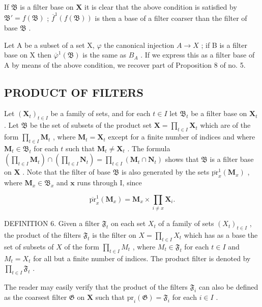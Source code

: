 If \(\mathfrak{B}\) is a filter base on \(\mathbf{X}\) it is clear that the above condition is satisfied by \(\mathfrak{B}' = f(\mathfrak{B})\) ; \(\overline{f}^1 (f(\mathfrak{B}))\) is then a base of a filter coarser than the filter of base \(\mathfrak{B}\) .

Let A be a subset of a set X, \(\varphi\) the canonical injection \(A \rightarrow X\) ; if B is a filter base on X then \(\overline{\varphi}^{1}(\mathfrak{B})\) is the same as \(B_{A}\) . If we express this as a filter base of A by means of the above condition, we recover part of Proposition 8 of no. 5.

\subsection{PRODUCT OF FILTERS}

Let \((\mathbf{X}_t)_{t \in I}\) be a family of sets, and for each \(t \in I\) let \(\mathfrak{B}_t\) be a filter base on \(\mathbf{X}_t\) . Let \(\mathfrak{B}\) be the set of subsets of the product set \(\mathbf{X} = \prod_{t \in I} \mathbf{X}_t\) which are of the form \(\prod_{t \in I} \mathbf{M}_t\) , where \(\mathbf{M}_t = \mathbf{X}_t\) except for a finite number of indices and where \(\mathbf{M}_t \in \mathfrak{B}_t\) for each \(t\) such that \(\mathbf{M}_t \neq \mathbf{X}_t\) . The formula \(\left(\prod_{t \in I} \mathbf{M}_t\right) \cap \left(\prod_{t \in I} \mathbf{N}_t\right) = \prod_{t \in I} (\mathbf{M}_t \cap \mathbf{N}_t)\) shows that \(\mathfrak{B}\) is a filter base on \(\mathbf{X}\) . Note that the filter of base \(\mathfrak{B}\) is also generated by the sets \(\overline{\mathrm{pr}}_x^1 (\mathbf{M}_x)\) , where \(\mathbf{M}_x\in \mathfrak{B}_x\) and \(\pmb{x}\) runs through I, since

\[
\overline {{\mathrm{pr}}} _ {x} ^ {1} \left(\mathbf {M} _ {x}\right) = \mathbf {M} _ {x} \times \prod_ {i \neq x} \mathbf {X} _ {i}.
\]

DEFINITION 6. Given a filter \(\mathfrak{F}_t\) on each set \(X_t\) of a family of sets \((X_t)_{t \in I}\) , the product of the filters \(\mathfrak{F}_t\) is the filter on \(X = \prod_{t \in I} X_t\) which has as a base the set of subsets of \(X\) of the form \(\prod_{t \in I} M_t\) , where \(M_t \in \mathfrak{F}_t\) for each \(t \in I\) and \(M_t = X_t\) for all but a finite number of indices. The product filter is denoted by \(\prod_{t \in I} \mathfrak{F}_t\) .

The reader may easily verify that the product of the filters \(\mathfrak{F}_i\) can also be defined as the coarsest filter \(\mathfrak{G}\) on \(\mathbf{X}\) such that \(\mathrm{pr}_i(\mathfrak{G}) = \mathfrak{F}_i\) for each \(i \in I\) .

